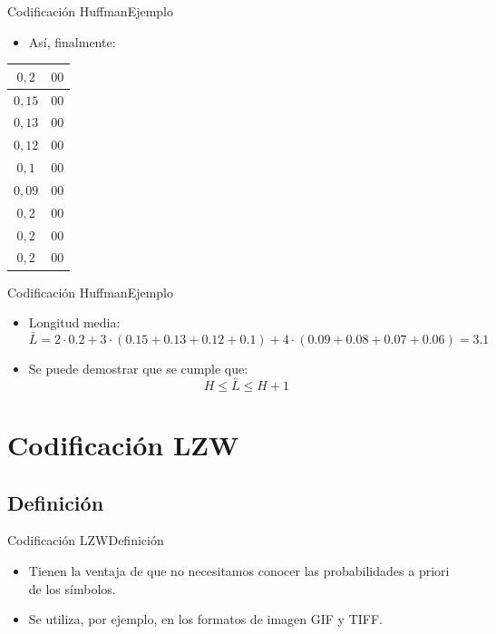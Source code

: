 \documentclass[10pt,compress]{beamer} %
\begin{document}
\begin{frame}{Codificación Huffman}{Ejemplo}
  \begin{itemize}
    \item Así, finalmente:
  \end{itemize}

  \begin{tabular}{|c|c|}
    \hline
    $0,2$ & $00$ \\
    \hline
    $0,15$ & $00$ \\
    \hline
    $0,13$ & $00$ \\
    \hline
    $0,12$ & $00$ \\
    \hline
    $0,1$ & $00$ \\
    \hline
    $0,09$ & $00$ \\
    \hline
    $0,2$ & $00$ \\
    \hline
    $0,2$ & $00$ \\
    \hline
    $0,2$ & $00$ \\
    \hline
  \end{tabular}
\end{frame}

\begin{frame}{Codificación Huffman}{Ejemplo}
  \begin{itemize}
    \item Longitud media:
    \begin{displaymath}
      \bar{L} = 2\cdot 0.2 + 3 \cdot (0.15 + 0.13 + 0.12 + 0.1) + 4 \cdot (0.09 + 0.08 + 0.07 + 0.06) = 3.1
    \end{displaymath}
    \item Se puede demostrar que se cumple que:
    \begin{displaymath}
      H \leq \bar{L} \leq H+1
    \end{displaymath}
  \end{itemize}

\end{frame}

\section{Codificación LZW}

\subsection{Definición}
\begin{frame}{Codificación LZW}{Definición}
	\begin{itemize}
    \item Tienen la ventaja de que no necesitamos conocer las probabilidades a priori de los símbolos.
    \item Se utiliza, por ejemplo, en los formatos de imagen GIF y TIFF.
	\end{itemize}
\end{frame}
\end{document}
